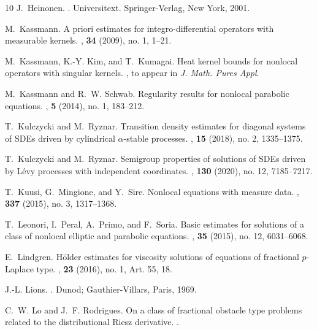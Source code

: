 \documentclass[11pt]{amsart}
\theoremstyle{plain}
\theoremstyle{definition}
\numberwithin{equation}{section}
\begin{document}
\begin{thebibliography}{10}
J.~Heinonen.
.
\newblock Universitext. Springer-Verlag, New York, 2001.

M.~Kassmann.
\newblock A priori estimates for integro-differential operators with measurable
  kernels.
, \textbf{34} (2009), no. 1, 1--21.

M.~Kassmann, K.-Y. Kim, and T.~Kumagai.
\newblock Heat kernel bounds for nonlocal operators with singular kernels.
,
\newblock to appear in\textit{ J. Math. Pures Appl}.

M.~Kassmann and R.~W. Schwab.
\newblock Regularity results for nonlocal parabolic equations.
, \textbf{5} (2014), no. 1, 183--212.

T.~Kulczycki and M.~Ryznar.
\newblock Transition density estimates for diagonal systems of {SDE}s driven by
  cylindrical {$\alpha$}-stable processes.
, \textbf{15} (2018), no. 2, 1335--1375.

T.~Kulczycki and M.~Ryznar.
\newblock Semigroup properties of solutions of {SDE}s driven by {L}\'{e}vy
  processes with independent coordinates.
, \textbf{130} (2020), no. 12, 7185--7217.

T.~Kuusi, G.~Mingione, and Y.~Sire.
\newblock Nonlocal equations with measure data.
, \textbf{337} (2015), no. 3, 1317--1368.

T.~Leonori, I.~Peral, A.~Primo, and F.~Soria.
\newblock Basic estimates for solutions of a class of nonlocal elliptic and
  parabolic equations.
, \textbf{35} (2015), no. 12, 6031--6068.

E.~Lindgren.
\newblock H\"{o}lder estimates for viscosity solutions of equations of
  fractional {$p$}-{L}aplace type.
, \textbf{23} (2016), no. 1, Art. 55,
  18.

J.-L. Lions.
.
\newblock Dunod; Gauthier-Villars, Paris, 1969.

C.~W. Lo and J.~F. Rodrigues.
\newblock On a class of fractional obstacle type problems related to the
  distributional {R}iesz derivative.
.


\end{thebibliography}
\end{document}
